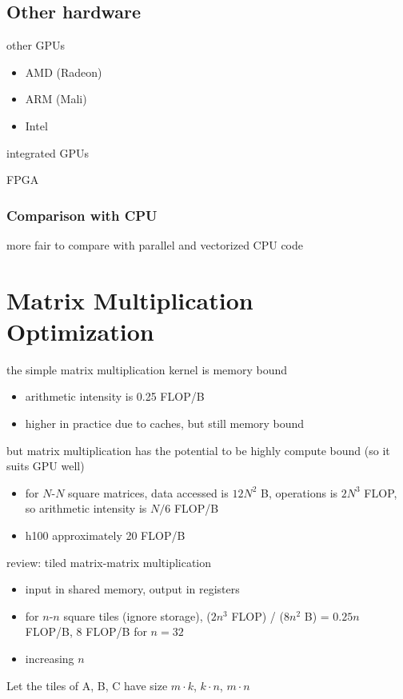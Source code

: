 \documentclass{article}
\begin{document}
\subsection{Other hardware}

other GPUs

\begin{itemize}
\item AMD (Radeon)
\item ARM (Mali)
\item Intel

\end{itemize}
integrated GPUs


FPGA


\subsubsection{Comparison with CPU}

more fair to compare with parallel and vectorized CPU code


\newpage
\section{Matrix Multiplication Optimization}

the simple matrix multiplication kernel is memory bound

\begin{itemize}
\item arithmetic intensity is 0.25 FLOP/B
\item higher in practice due to caches, but still memory bound
\end{itemize}
but matrix multiplication has the potential to be highly compute bound (so it suits GPU well)

\begin{itemize}
\item for $N$-$N$ square matrices, data accessed is $12N^2$ B, operations is $2N^3$ FLOP, so arithmetic intensity is $N/6$ FLOP/B
\item h100 approximately 20 FLOP/B

\end{itemize}
review: tiled matrix-matrix multiplication

\begin{itemize}
\item input in shared memory, output in registers
\item for $n$-$n$ square tiles (ignore storage), ($2n^3$ FLOP) / ($8n^2$ B) = $0.25n$ FLOP/B, $8$ FLOP/B for $n=32$
\item increasing $n$

\end{itemize}
Let the tiles of A, B, C have size $m\cdot k$, $k\cdot n$, $m\cdot n$
\end{document}
